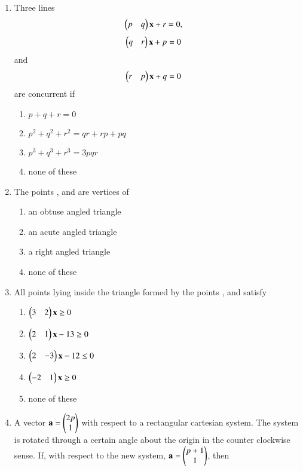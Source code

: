 \begin{enumerate}[label=\arabic*.,ref=\thesubsection.\theenumi]
    \item Three lines \begin{align}\begin{pmatrix}p & q\end{pmatrix} \mathbf {x} + r &= 0,\end{align} \begin{align}\begin{pmatrix}q & r\end{pmatrix} \mathbf {x} + p &= 0\end{align} and \begin{align}\begin{pmatrix}r & p\end{pmatrix} \mathbf {x} + q &= 0\end{align} are concurrent if
    \begin{enumerate}
     \item  $p+q+r=0$
     \item  $p^2+q^2+r^2=qr+rp+pq$
     \item  $p^3+q^3+r^3=3pqr$
     \item  none of these
     \end{enumerate}
    \item The points , and  are vertices of 
    \begin{enumerate}
     \item  an obtuse angled triangle
     \item  an acute angled triangle
     \item  a right angled triangle
     \item  none of these
     \end{enumerate}
    \item All points lying inside the triangle formed by the points ,  and  satisfy
    \begin{enumerate}
     \item  $\begin{pmatrix}3 & 2\end{pmatrix} \mathbf {x} \geq 0$
     \item  $\begin{pmatrix}2 & 1\end{pmatrix} \mathbf {x}-13\geq 0$
     \item  $\begin{pmatrix}2 & -3\end{pmatrix} \mathbf {x}-12\leq 0$
     \item  $\begin{pmatrix}-2 & 1\end{pmatrix} \mathbf {x} \geq 0$
     \item none of these
     \end{enumerate}
    \item A vector $\mathbf{a} = \begin{pmatrix}2p \\ 1\end{pmatrix}$  with respect to a rectangular cartesian system. The system is rotated through a certain angle about the origin in the counter clockwise sense. If, with respect to the new system,  $\mathbf {a} = \begin{pmatrix}p+1\\1\end{pmatrix}$, then

\end{enumerate}
